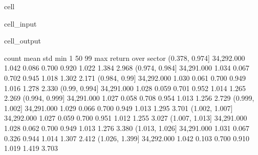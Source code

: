 \documentclass[letterpaper,10pt,english]{jupyterBook}
\begin{document}
\begin{sphinxuseclass}{cell}\begin{sphinxVerbatimInput}

\begin{sphinxuseclass}{cell_input}
\begin{sphinxVerbatim}[commandchars=\\\{\}]
  
  \PYG{p}{[}\PYG{p}{]} 
\PYG{p}{[}\PYG{p}{]}\PYG{p}{[} \PYG{p}{]}
\PYG{p}{[}\PYG{p}{]}
\end{sphinxVerbatim}

\end{sphinxuseclass}\end{sphinxVerbatimInput}
\begin{sphinxVerbatimOutput}

\begin{sphinxuseclass}{cell_output}
\begin{sphinxVerbatim}[commandchars=\\\{\}]
                        count  mean   std   min    1\PYGZpc{}   50\PYGZpc{}   99\PYGZpc{}   max
return over sector                                                     
(0.378, 0.974]     34,292.000 1.042 0.086 0.700 0.920 1.022 1.384 2.968
(0.974, 0.984]     34,291.000 1.034 0.067 0.702 0.945 1.018 1.302 2.171
(0.984, 0.99]      34,292.000 1.030 0.061 0.700 0.949 1.016 1.278 2.330
(0.99, 0.994]      34,291.000 1.028 0.059 0.701 0.952 1.014 1.265 2.269
(0.994, 0.999]     34,291.000 1.027 0.058 0.708 0.954 1.013 1.256 2.729
(0.999, 1.002]     34,291.000 1.029 0.066 0.700 0.949 1.013 1.295 3.701
(1.002, 1.007]     34,292.000 1.027 0.059 0.700 0.951 1.012 1.255 3.027
(1.007, 1.013]     34,291.000 1.028 0.062 0.700 0.949 1.013 1.276 3.380
(1.013, 1.026]     34,291.000 1.031 0.067 0.326 0.944 1.014 1.307 2.412
(1.026, 1.399]     34,292.000 1.042 0.103 0.700 0.910 1.019 1.419 3.703
\end{sphinxVerbatim}


\end{sphinxuseclass}
\end{sphinxVerbatimOutput}
\end{sphinxuseclass}
\end{document}

